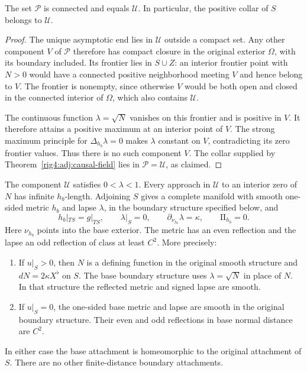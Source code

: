 \begin{lemma}
\label{rig4:sta:connected-positive-set}
The set $\mathcal P$ is connected and equals $\mathcal U$. In particular,
the positive collar of $S$ belongs to $\mathcal U$.
\end{lemma}

\begin{proof}
The unique asymptotic end lies in $\mathcal U$ outside a compact set.
Any other component $V$ of $\mathcal P$ therefore has compact closure
in the original exterior $\Omega$, with its boundary included.
Its frontier lies in $S\cup Z$: an interior frontier point with $N>0$
would have a connected positive neighborhood meeting $V$ and hence
belong to $V$. The frontier is nonempty, since otherwise $V$ would
be both open and closed in the connected interior of $\Omega$, which
also contains $\mathcal U$.

The continuous function $\lambda=\sqrt N$ vanishes on this frontier
and is positive in $V$. It therefore attains a positive maximum at
an interior point of $V$. The strong maximum principle for
$\Delta_{h_b}\lambda=0$ makes $\lambda$ constant on $V$, contradicting
its zero frontier values. Thus there is no such component $V$.
The collar supplied by Theorem~\ref{rig4:adj:causal-field} lies in
$\mathcal P=\mathcal U$, as claimed.
\end{proof}

\begin{proposition}
\label{rig4:sta:complete-base}
The component $\mathcal U$ satisfies $0<\lambda<1$. Every approach in
$\mathcal U$ to an interior zero of $N$ has infinite $h_b$-length.
Adjoining $S$ gives a complete manifold with smooth one-sided metric
$h_b$ and lapse $\lambda$, in the boundary structure specified below, and
\begin{equation}\label{rig4:sta:boundary-data}
 h_b|_{TS}=g|_{TS},\qquad \lambda|_S=0,
 \qquad \partial_{\nu_{h_b}}\lambda=\kappa,
 \qquad \mathrm{II}_{h_b}=0.
\end{equation}
Here $\nu_{h_b}$ points into the base exterior. The metric has an even
reflection and the lapse an odd reflection of class at least $C^2$.
More precisely:
\begin{enumerate}[label=(\roman*)]
\item If $u|_S>0$, then $N$ is a defining function in the original
smooth structure and $dN=2\kappa X^\flat$ on $S$. The base boundary
structure uses $\lambda=\sqrt N$ in place of $N$. In that structure
the reflected metric and signed lapse are smooth.
\item If $u|_S=0$, the one-sided base metric and lapse are smooth in
the original boundary structure. Their even and odd reflections in
base normal distance are $C^2$.
\end{enumerate}
In either case the base attachment is homeomorphic to the original
attachment of $S$. There are no other finite-distance boundary
attachments.
\end{proposition}

